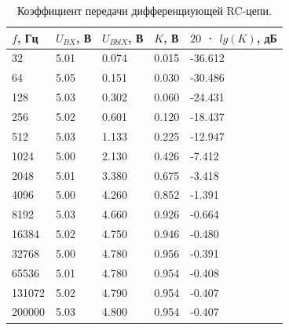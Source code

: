 \begin{table}[H]
	\begin{center}
	\caption{Коэффициент передачи дифференциующей RC-цепи.}
	\def\arraystretch{1.5}
		\begin{tabularx}{\textwidth}{|X|X|X|X|X|}
			\hline
			$f$, Гц & $U_{BX}$, В & $U_{BblX}$, В & $K$, В & $20$ · $lg(K)$, дБ\\\hline
			32 & 5.01 & 0.074 & 0.015 & -36.612\\\hline
			64 & 5.05 & 0.151 & 0.030 & -30.486\\\hline
			128 & 5.03 & 0.302 & 0.060 & -24.431\\\hline
			256 & 5.02 & 0.601 & 0.120 & -18.437\\\hline
			512 & 5.03 & 1.133 & 0.225 & -12.947\\\hline
			1024 & 5.00 & 2.130 & 0.426 & -7.412\\\hline
			2048 & 5.01 & 3.380 & 0.675 & -3.418\\\hline
			4096 & 5.00 & 4.260 & 0.852 & -1.391\\\hline
			8192 & 5.03 & 4.660 & 0.926 & -0.664\\\hline
			16384 & 5.02 & 4.750 & 0.946 & -0.480\\\hline
			32768 & 5.00 & 4.780 & 0.956 & -0.391\\\hline
			65536 & 5.01 & 4.780 & 0.954 & -0.408\\\hline
			131072 & 5.02 & 4.790 & 0.954 & -0.407\\\hline
			200000 & 5.03 & 4.800 & 0.954 & -0.407\\\hline	
		\end{tabularx}
		\label{tabular:1}
	\end{center}
\end{table}

